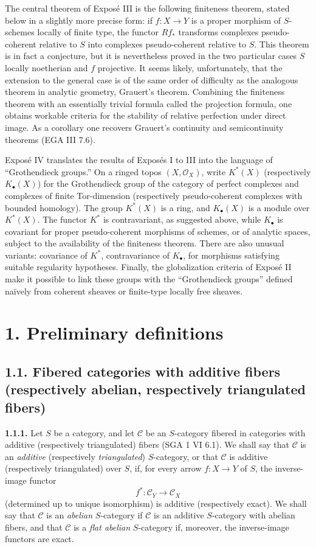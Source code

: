 The central theorem of Exposé III is the following finiteness theorem, stated below in a slightly more precise form: if \(f:X\to Y\) is a proper morphism of \(S\)-schemes locally of finite type, the functor \(Rf_*\) transforms complexes pseudo-coherent relative to \(S\) into complexes pseudo-coherent relative to \(S\). This theorem is in fact a conjecture, but it is nevertheless proved in the two particular cases \(S\) locally noetherian and \(f\) projective. It seems likely, unfortunately, that the extension to the general case is of the same order of difficulty as the analogous theorem in analytic geometry, Grauert's theorem. Combining the finiteness theorem with an essentially trivial formula called the projection formula, one obtains workable criteria for the stability of relative perfection under direct image. As a corollary one recovers Grauert's continuity and semicontinuity theorems (EGA III 7.6).

Exposé IV translates the results of Exposés I to III into the language of ``Grothendieck groups.'' On a ringed topos \((X,\mathcal O_X)\), write \(K^*(X)\) (respectively \(K_\bullet(X)\)) for the Grothendieck group of the category of perfect complexes and complexes of finite Tor-dimension (respectively pseudo-coherent complexes with bounded homology). The group \(K^*(X)\) is a ring, and \(K_\bullet(X)\) is a module over \(K^*(X)\). The functor \(K^*\) is contravariant, as suggested above, while \(K_\bullet\) is covariant for proper pseudo-coherent morphisms of schemes, or of analytic spaces, subject to the availability of the finiteness theorem. There are also unusual variants: covariance of \(K^*\), contravariance of \(K_\bullet\), for morphisms satisfying suitable regularity hypotheses. Finally, the globalization criteria of Exposé II make it possible to link these groups with the ``Grothendieck groups'' defined naïvely from coherent sheaves or finite-type locally free sheaves.

\section*{1. Preliminary definitions}

\subsection*{1.1. Fibered categories with additive fibers (respectively abelian, respectively triangulated fibers)}

\textbf{1.1.1.} Let \(S\) be a category, and let \(\mathcal C\) be an \(S\)-category fibered in categories with additive (respectively triangulated) fibers (SGA 1 VI 6.1). We shall say that \(\mathcal C\) is an \emph{additive} (respectively \emph{triangulated}) \(S\)-category, or that \(\mathcal C\) is additive (respectively triangulated) over \(S\), if, for every arrow \(f:X\to Y\) of \(S\), the inverse-image functor
\[
  f^*:\mathcal C_Y\longrightarrow \mathcal C_X
\]
(determined up to unique isomorphism) is additive (respectively exact). We shall say that \(\mathcal C\) is an \emph{abelian} \(S\)-category if \(\mathcal C\) is an additive \(S\)-category with abelian fibers, and that \(\mathcal C\) is a \emph{flat abelian} \(S\)-category if, moreover, the inverse-image functors are exact.

